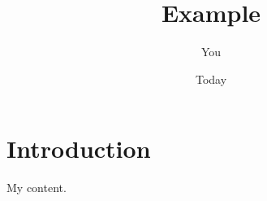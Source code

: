 \documentclass{article}
\title{Example}
\author{You}
\date{Today}
\begin{document}
\maketitle

\section{Introduction}
My content. \cite{dummy}



\end{document}
